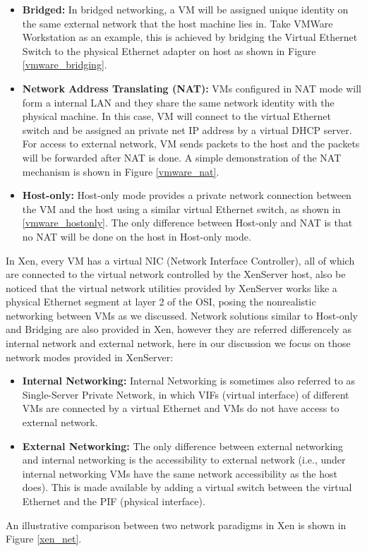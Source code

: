 \documentclass[journal,comsoc]{IEEEtran}
\begin{document}
\begin{itemize}
	\item {\bf Bridged: }In bridged networking, a VM will be assigned unique identity on the same external network that the host machine lies in. Take VMWare Workstation as an example, this is achieved by bridging the Virtual Ethernet Switch to the physical Ethernet adapter on host as shown in Figure \ref{vmware_bridging}.
	\item {\bf Network Address Translating (NAT): }VMs configured in NAT mode will form a internal LAN and they share the same network identity with the physical machine. In this case, VM will connect to the virtual Ethernet switch and be assigned an private net IP address by a virtual DHCP server. For access to external network, VM sends packets to the host and the packets will be forwarded after NAT is done. A simple demonstration of the NAT mechanism is shown in Figure \ref{vmware_nat}.
	\item {\bf Host-only: }Host-only mode provides a private network connection between the VM and the host using a similar virtual Ethernet switch, as shown in \ref{vmware_hostonly}. The only difference between Host-only and NAT is that no NAT will be done on the host in Host-only mode.
\end{itemize}

In Xen, every VM has a virtual NIC (Network Interface Controller), all of which are connected to the virtual network controlled by the XenServer host, also be noticed that the virtual network utilities provided by XenServer works like a physical Ethernet segment at layer 2 of the OSI, posing the nonrealistic networking between VMs as we discussed. Network solutions similar to Host-only and Bridging are also provided in Xen, however they are referred differencely as internal network and external network, here in our discussion we focus on those network modes provided in XenServer:
\begin{itemize}
	\item {\bf Internal Networking: }Internal Networking is sometimes also referred to as Single-Server Private Network, in which VIFs (virtual interface) of different VMs are connected by a virtual Ethernet and VMs do not have access to external network.
	\item {\bf External Networking: }The only difference between external networking and internal networking is the accessibility to external network (i.e., under internal networking VMs have the same network accessibility as the host does). This is made available by adding a virtual switch between the virtual Ethernet and the PIF (physical interface). 
\end{itemize} 
An illustrative comparison between two network paradigms in Xen is shown in Figure \ref{xen_net}.
\end{document}
